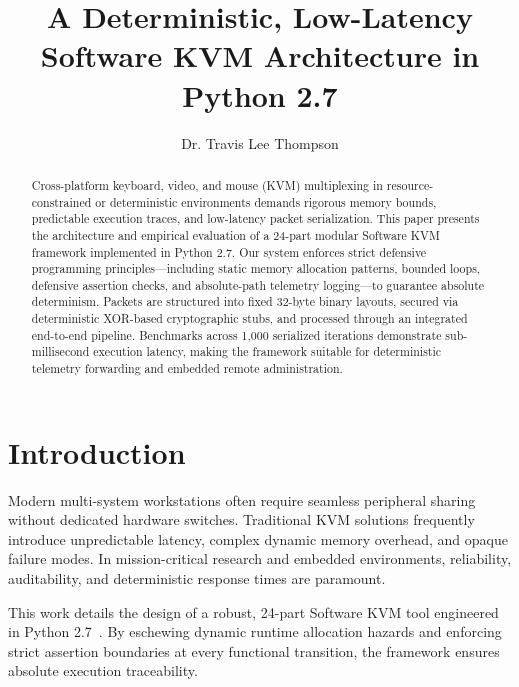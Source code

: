 \documentclass[sigconf,nonacm]{acmart}
\begin{document}
\title{A Deterministic, Low-Latency Software KVM Architecture in Python 2.7}

\author{Dr. Travis Lee Thompson}

\begin{abstract}
Cross-platform keyboard, video, and mouse (KVM) multiplexing in resource-constrained or deterministic environments demands rigorous memory bounds, predictable execution traces, and low-latency packet serialization. This paper presents the architecture and empirical evaluation of a 24-part modular Software KVM framework implemented in Python 2.7. Our system enforces strict defensive programming principles—including static memory allocation patterns, bounded loops, defensive assertion checks, and absolute-path telemetry logging—to guarantee absolute determinism. Packets are structured into fixed 32-byte binary layouts, secured via deterministic XOR-based cryptographic stubs, and processed through an integrated end-to-end pipeline. Benchmarks across 1,000 serialized iterations demonstrate sub-millisecond execution latency, making the framework suitable for deterministic telemetry forwarding and embedded remote administration.
\end{abstract}


\maketitle

\section{Introduction}
Modern multi-system workstations often require seamless peripheral sharing without dedicated hardware switches. Traditional KVM solutions frequently introduce unpredictable latency, complex dynamic memory overhead, and opaque failure modes. In mission-critical research and embedded environments, reliability, auditability, and deterministic response times are paramount.

This work details the design of a robust, 24-part Software KVM tool engineered in Python 2.7~\cite{thompson2026kvm}. By eschewing dynamic runtime allocation hazards and enforcing strict assertion boundaries at every functional transition, the framework ensures absolute execution traceability.
\end{document}
